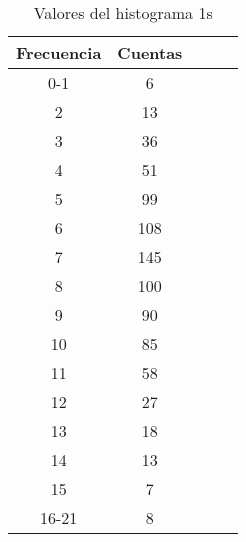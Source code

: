 \begin{center}
\begin{table}[H]
\caption{Valores del histograma 1s}
\label{Tab:histo_1smanual}
\begin{tabular}{ccccc}
\toprule
Frecuencia & Cuentas \\
\midrule
{    0-1} & \num{    6} \\
\num{    2} & \num{   13} \\
\num{    3} & \num{   36} \\
\num{    4} & \num{   51} \\
\num{    5} & \num{   99} \\
\num{    6} & \num{  108} \\
\num{    7} & \num{  145} \\
\num{    8} & \num{  100} \\
\num{    9} & \num{   90} \\
\num{   10} & \num{   85} \\
\num{   11} & \num{   58} \\
\num{   12} & \num{   27} \\
\num{   13} & \num{   18} \\
\num{   14} & \num{   13} \\
\num{   15} & \num{    7} \\
{   16-21} & \num{    8} \\
\bottomrule
\end{tabular}
\end{table}
\end{center}
